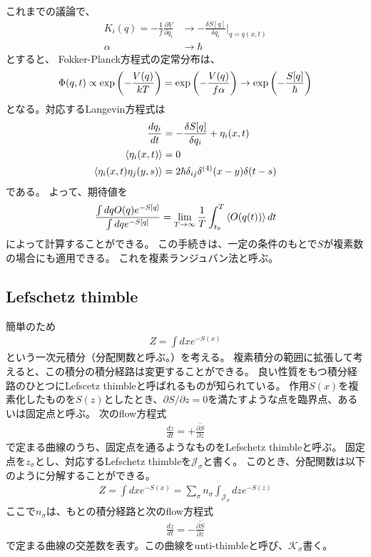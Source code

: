 \documentclass[]{ltjsarticle}
\newcommand{\del}{\partial}
\newcommand{\calJ}{\mathcal{J}}
\newcommand{\calK}{\mathcal{K}}
\begin{document}
これまでの議論で、
\begin{align}
    K_i(q) = -\frac{1}{f}\frac{\del V}{\del q_i} &\to -\frac{\delta S[q]}{\delta q_i}\Bigg|_{q=q(x,t)} \\
    \alpha &\to \hbar
\end{align}
とすると、
Fokker-Planck方程式の定常分布は、
\begin{align}
    \Phi(q, t) \propto \exp\qty(- \frac{V(q)}{kT})
     = 
     \exp\qty(- \frac{V(q)}{f\alpha})
    \to 
    \exp\qty(-\frac{S[q]}{\hbar})
\end{align}
となる。対応するLangevin方程式は
\begin{align}
    \frac{d q_i}{dt} &= -\frac{\delta S[q]}{\delta q_i} + \eta_i(x,t) \\
    \expval{\eta_i(x,t)} &= 0 \\
    \expval{\eta_i(x,t) \eta_j(y,s)} &= 2\hbar \delta_{ij}\delta^{(4)}(x-y)\delta(t-s)
\end{align}
である。
よって、期待値を
\begin{align}
    \frac{\int dq O(q) e^{-S[q]}}{\int dq e^{-S[q]}}
    =
    \lim_{T \to \infty} 
    \frac{1}{T}\int_{t_0}^T \expval{O(q(t))} dt
\end{align}
によって計算することができる。
この手続きは、一定の条件のもとで$S$が複素数の場合にも適用できる。
これを複素ランジュバン法と呼ぶ。



\subsection{Lefschetz thimble}
簡単のため
\begin{align}
	Z = \int dx e^{-S(x)}
\end{align}
という一次元積分（分配関数と呼ぶ。）を考える。
複素積分の範囲に拡張して考えると、この積分の積分経路は変更することができる。
良い性質をもつ積分経路のひとつにLefscetz thimbleと呼ばれるものが知られている。
作用$S(x)$を複素化したものを$S(z)$としたとき、$\del S/\del z = 0$を満たすような点を臨界点、あるいは固定点と呼ぶ。
次のflow方程式
\begin{align}
	\frac{d z}{d t} = +\overline{\frac{\del S}{\del z}}
\end{align}
で定まる曲線のうち、固定点を通るようなものをLefschetz thimbleと呼ぶ。
固定点を$z_\sigma$とし、対応するLefschetz thimbleを$\calJ_\sigma$と書く。
このとき、分配関数は以下のように分解することができる。
\begin{align}
	Z = \int dx e^{-S(x)} = \sum_{\sigma}n_\sigma \int_{\calJ_\sigma} dz e^{-S(z)}
\end{align}
ここで$n_\sigma$は、もとの積分経路と次のflow方程式
\begin{align}
	\frac{d z}{d t} = -\overline{\frac{\del S}{\del z}}
\end{align}
で定まる曲線の交差数を表す。この曲線をunti-thimbleと呼び、$\calK_\sigma$書く。
\end{document}
